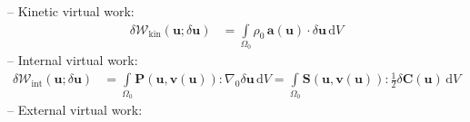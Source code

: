 \documentclass[a4paper,12pt]{report}
\newcommand{\Om}{\mathit{\Omega}}
\begin{document}
-- Kinetic virtual work:
\begin{equation}
\label{equation-deltaw-kin}
\begin{aligned}
\delta \mathcal{W}_{\mathrm{kin}}(\boldsymbol{u};\delta\boldsymbol{u}) &= \int\limits_{\Om_{0}} \rho_{0}\,\boldsymbol{a}(\boldsymbol{u}) \cdot \delta\boldsymbol{u} \,\mathrm{d}V
\end{aligned}
\end{equation}
-- Internal virtual work:
\begin{equation}
\label{equation-deltaw-int}
\begin{aligned}
\delta \mathcal{W}_{\mathrm{int}}(\boldsymbol{u};\delta\boldsymbol{u}) &= \int\limits_{\Om_{0}} \boldsymbol{P}(\boldsymbol{u},\boldsymbol{v}(\boldsymbol{u})) : \nabla_{0} \delta\boldsymbol{u} \,\mathrm{d}V = \int\limits_{\Om_{0}} \boldsymbol{S}(\boldsymbol{u},\boldsymbol{v}(\boldsymbol{u})) : \frac{1}{2}\delta\boldsymbol{C}(\boldsymbol{u}) \,\mathrm{d}V
\end{aligned}
\end{equation}
-- External virtual work:\\
\end{document}
